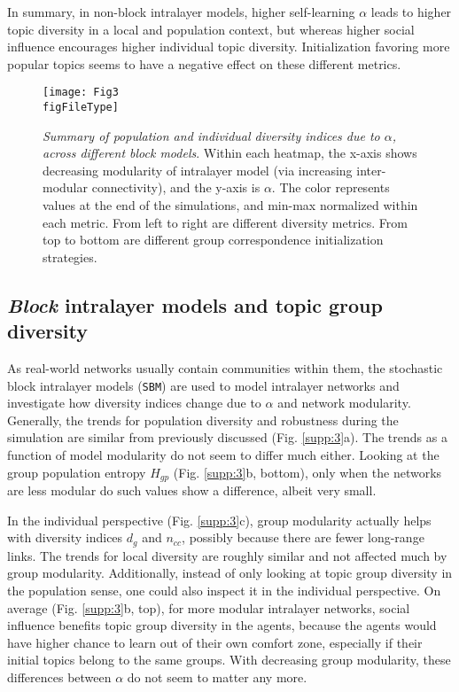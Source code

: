 \documentclass{svproc}
\def\figFileType{.eps}
\begin{document}
In summary, in non-block intralayer models, higher self-learning $\alpha$ leads to higher topic diversity in a local and population context, but whereas higher social influence encourages higher individual topic diversity.
Initialization favoring more popular topics seems to have a negative effect on these different metrics.

\begin{figure}[!ht]
    \centering
    \texttt{[image: Fig3\\figFileType]}
    \caption{
    \textit{Summary  of  population  and  individual  diversity  indices  due  to $\alpha$,  across  different  block  models}.
    Within each heatmap, the x-axis shows decreasing modularity of intralayer model (via increasing inter-modular connectivity), and the y-axis is $\alpha$.
    The color represents values at the end of the simulations, and min-max normalized within each metric.
    From left to right are different diversity metrics. From top to bottom are different group correspondence initialization strategies.
    }
    \label{fig:3}
\end{figure}


\subsection{\textit{Block} intralayer models and topic group diversity}
\label{results:block}

As real-world networks usually contain communities within them, the stochastic block intralayer models (\texttt{SBM}) are used to model intralayer networks and investigate how diversity indices change due to $\alpha$ and network modularity.
Generally, the trends for population diversity and robustness during the simulation are similar from previously discussed (Fig. \ref{supp:3}a).
The trends as a function of model modularity do not seem to differ much either.
Looking at the group population entropy $H_{gp}$ (Fig. \ref{supp:3}b, bottom), only when the networks are less modular do such values show a difference, albeit very small.

In the individual perspective (Fig. \ref{supp:3}c), group modularity actually helps with diversity indices $d_g$ and $n_{cc}$, possibly because there are fewer long-range links.
The trends for local diversity are roughly similar and not affected much by group modularity.
Additionally, instead of only looking at topic group diversity in the population sense, one could also inspect it in the individual perspective.
On average (Fig. \ref{supp:3}b, top), for more modular intralayer networks, social influence benefits topic group diversity in the agents, because the agents would have higher chance to learn out of their own comfort zone, especially if their initial topics belong to the same groups.
With decreasing group modularity, these differences between $\alpha$ do not seem to matter any more.
\end{document}
